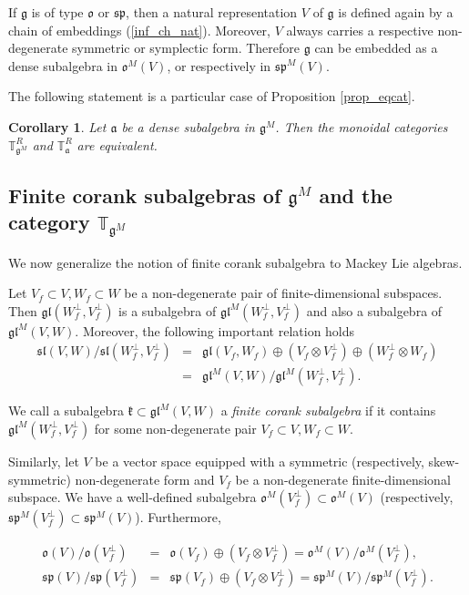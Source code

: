 \documentclass{svmult}
\newtheorem{cor}[theo]{Corollary}
\newcommand{\TT}{\mathbb{T}}
\renewcommand{\sp}{\mathfrak{sp}}
\renewcommand{\sl}{\mathfrak{sl}}
\newcommand{\kk}{\mathfrak{k}}
\newcommand{\oo}{\mathfrak{o}}
\renewcommand{\aa}{\mathfrak{a}}
\renewcommand{\gg}{\mathfrak{g}}
\newcommand{\gl}{\mathfrak{gl}}
\begin{document}
If $\gg$ is of type $\oo$ or $\sp$, then a natural representation $V$ of $\gg$ is defined again by a chain of embeddings (\ref{inf_ch_nat}). Moreover, $V$ always carries a respective non-degenerate symmetric or symplectic form. Therefore $\gg$ can be embedded as a dense subalgebra in $\oo^M(V)$, or respectively in $\sp^M(V)$. 

The following statement is a particular case of Proposition \ref{prop_eqcat}. 

\begin{cor}\label{prop_squot} Let $\aa$ be a dense subalgebra in $\gg^M$. Then the monoidal categories $\TT^R_{\gg^M}$ and $\TT^R_{\aa}$ are equivalent.
\end{cor}

\subsection {Finite corank subalgebras of $\gg^M$ and the category $\TT_{\gg^M}$}\label{sect:7.3} 
We now generalize the notion of finite corank subalgebra to Mackey Lie algebras.

Let $V_f\subset V, W_f\subset W$ be a non-degenerate pair of finite-dimensional subspaces. Then $\gl(W_f^\perp,V_f^\perp)$ is a subalgebra of $\gl^M(W_f^\perp,V_f^\perp)$ and also a subalgebra of   
$\gl^M(V,W)$. Moreover, the following important relation holds
\begin{eqnarray}\label{gl}
\sl(V,W)/\sl(W_f^\perp,V_f^\perp)&=&\gl(V_f,W_f)\oplus (V_f\otimes V_f^\perp) \oplus (W_f^\perp\otimes W_f) \nonumber\\
&=&\gl^M(V,W)/\gl^M(W_f^\perp,V_f^\perp).
\end{eqnarray} 

We call a subalgebra $\kk\subset \gl^M(V,W)$ a \textit{finite corank subalgebra} if it contains  
$\gl^M(W_f^\perp,V_f^\perp)$ for some non-degenerate pair $V_f \subset V, W_f \subset W$.

Similarly, let $V$ be a vector space equipped with a symmetric (respectively, skew-symmetric) non-degenerate form and $V_f$ be a non-degenerate finite-dimensional
subspace. We have a well-defined subalgebra $\oo^M(V_f^\perp)\subset \oo^M(V)$
(respectively, $\sp^M(V_f^\perp)\subset \sp^M(V)$). Furthermore,

\begin{eqnarray}\label{0}
\oo(V)/\oo(V_f^\perp)&=&\oo(V_f)\oplus (V_f\otimes V_f^\perp)=\oo^M(V)/\oo^M(V_f^\perp),\nonumber\\
\sp(V)/\sp(V_f^\perp)&=&\sp(V_f)\oplus (V_f\otimes V_f^\perp)=\sp^M(V)/\sp^M(V_f^\perp).
\end{eqnarray} 
\end{document}
